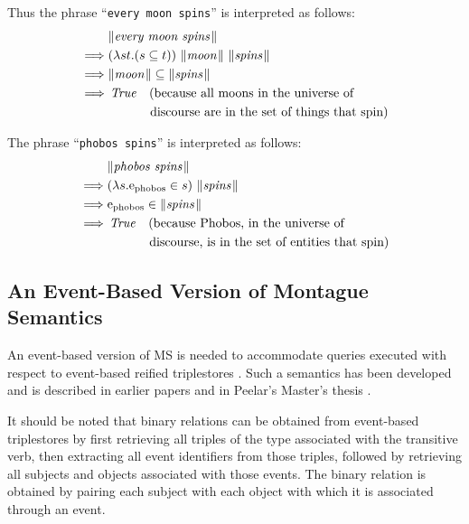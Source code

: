 \documentclass[../main.tex]{subfiles}
\begin{document}
\begin{refsection}
Thus the phrase ``\texttt{every moon spins}'' is interpreted as follows:
\begin{equation*}
	\begin{split}
		&\meaningof{every moon spins}\\
		\implies& (\lambda st.(s \subseteq t)) \ \meaningof{moon} \ \meaningof{spins} \\
		\implies& \meaningof{moon}  \subseteq  \meaningof{spins} \\
		\implies& \True \quad (\dmathrm{because all moons in the universe of} \\
		&\dmathrm{\quad\qquad\ discourse are in the set of things that spin}) \\
	\end{split}
\end{equation*}

The phrase ``\texttt{phobos spins}'' is interpreted as follows:
\begin{equation*}
	\begin{split}
		&\meaningof{phobos spins}\\
		\implies& (\lambda s.\entityassoc{\phobos} \in s) \ \meaningof{spins}\\
		\implies& \entityassoc{\phobos} \in  \meaningof{spins} \\
		\implies& \True \quad (\dmathrm{because Phobos, in the universe of} \\
		&\dmathrm{\quad\qquad\ discourse, is in the set of entities that spin})
	\end{split}
\end{equation*}
\subsection{An Event-Based Version of Montague Semantics}
\label{icsc2020conf:evflms}
An event-based version of MS is needed to accommodate queries executed with respect to event-based reified triplestores \cite{graphmqslide}. Such a semantics has been developed and is described in
earlier papers \cite{graphmqslide, frost2014demonstration} and in Peelar's Master's thesis \cite{peelar2016accommodating}.

It should be noted that binary relations can be obtained from event-based triplestores by first retrieving
all triples of the type associated with the transitive verb, then extracting all event identifiers from those
triples, followed by retrieving all subjects and objects associated with those events. The binary relation
is obtained by pairing each subject with each object with which it is associated through an event.


\end{refsection}
\end{document}
